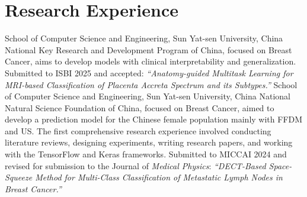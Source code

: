 \documentclass[11pt,a4paper, final]{moderncv}
\begin{document}
\section{\textbf{Research Experience}}%
	{}{}{School of Computer Science and Engineering, Sun Yat-sen University, China}
	{National Key Research and Development Program of China, focused on Breast Cancer, 
	aims to develop models with clinical interpretability and generalization.}
	{Submitted to ISBI 2025 and accepted: 
	\emph{``Anatomy-guided Multitask Learning for MRI-based Classification of Placenta Accreta Spectrum and its Subtypes.''}}
	{}{}{School of Computer Science and Engineering, Sun Yat-sen University, China}
	{National Natural Science Foundation of China, focused on Breast Cancer, 
	aimed to develop a prediction model for the Chinese female population mainly with FFDM and US.}
	{The first comprehensive research experience involved conducting literature reviews, designing experiments, 
	writing research papers, and working with the TensorFlow and Keras frameworks.}
	{Submitted to MICCAI 2024 and revised for submission to the Journal of \emph{Medical Physics}: 
	\emph{``DECT-Based Space-Squeeze Method for Multi-Class Classification of Metastatic Lymph Nodes in Breast Cancer.''}}
\end{document}
